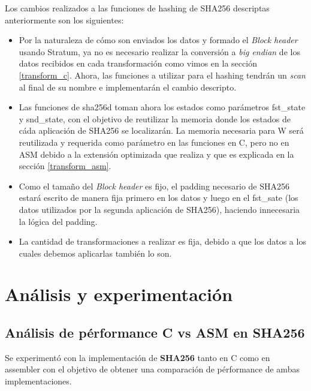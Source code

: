 \documentclass[a4paper, 10pt, twoside]{article}
\begin{document}
Los cambios realizados a las funciones de hashing de SHA256 descriptas anteriormente son los siguientes:
\begin{itemize}
	\item Por la naturaleza de cómo son enviados los datos y formado el \textit{Block header} usando Stratum, ya no es necesario realizar la conversión a \textit{big endian} de los datos recibidos en cada transformación como vimos en la sección \ref{transform_c}. Ahora, las funciones a utilizar para el hashing tendrán un \textit{scan} al final de su nombre e implementarán el cambio descripto.
	\item Las funciones de sha256d toman ahora los estados como parámetros fst\_state y snd\_state, con el objetivo de reutilizar la memoria donde los estados de cáda aplicación de SHA256 se localizarán. La memoria necesaria para W será reutilizada y requerida como parámetro en las funciones en C, pero no en ASM debido a la extensión optimizada que realiza y que es explicada en la sección \ref{transform_asm}.
	\item Como el tamaño del \textit{Block header} es fijo, el padding necesario de SHA256 estará escrito de manera fija primero en los datos y luego en el fst\_sate (los datos utilizados por la segunda aplicación de SHA256), haciendo innecesaria la lógica del padding.
	\item La cantidad de transformaciones a realizar es fija, debido a que los datos a los cuales debemos aplicarlas también lo son.
\end{itemize}



\section{Análisis y experimentación}

\subsection{Análisis de pérformance C vs ASM en SHA256}
Se experimentó con la implementación de \textbf{SHA256} tanto en C como en assembler con el objetivo de obtener una comparación de pérformance de ambas implementaciones.
\end{document}
